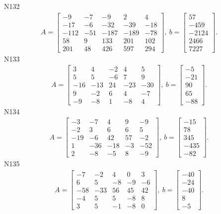 \documentclass[11pt]{report}
\begin{document}
N132
\begin{align*}
 A = \left[\begin{matrix}-9 & -7 & -9 & 2 & 4\\-17 & -6 & -32 & -39 & -18\\-112 & -51 & -187 & -189 & -78\\58 & 9 & 133 & 201 & 102\\201 & 48 & 426 & 597 & 294\end{matrix}\right],
\ b = \left[\begin{matrix}57\\-459\\-2124\\2466\\7227\end{matrix}\right]. 
 \end{align*}
N133
\begin{align*}
 A = \left[\begin{matrix}3 & 4 & -2 & 4 & 5\\5 & 5 & -6 & 7 & 9\\-16 & -13 & 24 & -23 & -30\\9 & -2 & 6 & 4 & -7\\-9 & -8 & 1 & -8 & 4\end{matrix}\right],
\ b = \left[\begin{matrix}-5\\-21\\90\\65\\-88\end{matrix}\right]. 
 \end{align*}
N134
\begin{align*}
 A = \left[\begin{matrix}-3 & -7 & 4 & 9 & -9\\-2 & 3 & 6 & 6 & 5\\-19 & -6 & 42 & 57 & -2\\1 & -36 & -18 & -3 & -52\\2 & -8 & -5 & 8 & -9\end{matrix}\right],
\ b = \left[\begin{matrix}-15\\78\\345\\-435\\-82\end{matrix}\right]. 
 \end{align*}
N135
\begin{align*}
 A = \left[\begin{matrix}-7 & -2 & 4 & 0 & 3\\6 & 5 & -8 & -9 & -6\\-58 & -33 & 56 & 45 & 42\\-4 & 5 & 5 & -8 & 8\\3 & 5 & -1 & -8 & 0\end{matrix}\right],
\ b = \left[\begin{matrix}-40\\-24\\-40\\8\\-5\end{matrix}\right]. 
 \end{align*}
\end{document}
